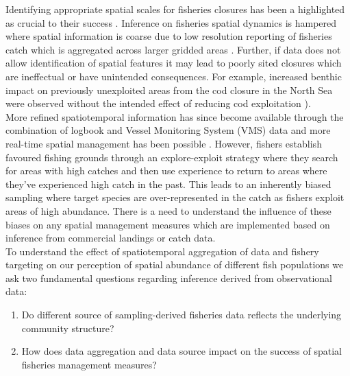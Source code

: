 \documentclass[review]{elsarticle}
\begin{document}
Identifying appropriate spatial scales for fisheries closures has been a
highlighted as crucial to their success \citep{Costello2010, Dunn2016}.
Inference on fisheries spatial dynamics is hampered where spatial information
is coarse due to low resolution reporting of fisheries catch which is
aggregated across larger gridded areas \citep{Branch2005}. Further, if data
does not allow identification of spatial features it may lead to poorly sited
closures which are ineffectual or have unintended consequences. For example,
increased benthic impact on previously unexploited areas from the cod closure
in the North Sea were observed without the intended effect of reducing cod
exploitation \citep{Rijnsdorp2001,Dinmore2003}).\\ 

More refined spatiotemporal information has since become available through the
combination of logbook and Vessel Monitoring System (VMS) data \citep{Lee2010,
	Bastardie2010, Gerritsen2012, Mateo2016} and more real-time spatial
management has been possible \citep[e.g.][]{Holmes2011}.  However, fishers
establish favoured fishing grounds through an explore-exploit strategy
\citep{Rijnsdorp2011, Bailey2018} where they search for areas with high catches
and then use experience to return to areas where they've experienced high catch
in the past.  This leads to an inherently biased sampling where target species
are over-represented in the catch as fishers exploit areas of high abundance.
There is a need to understand the influence of these biases on any spatial
management measures which are implemented based on inference from commercial
landings or catch data. \\ 

To understand the effect of spatiotemporal aggregation of data and fishery
targeting on our perception of spatial abundance of different fish populations
we ask two fundamental questions regarding inference derived from observational
data:

\begin{enumerate}
	\item Do different source of sampling-derived fisheries data
		reflects the underlying community structure? 	
	\item How does data aggregation and data source impact on the success
		of spatial fisheries management measures?
\end{enumerate}
	
\end{document}
